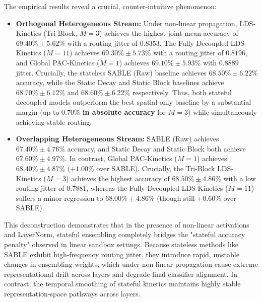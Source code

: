 The empirical results reveal a crucial, counter-intuitive phenomenon:
\begin{itemize}
    \item \textbf{Orthogonal Heterogeneous Stream:} Under non-linear propagation, LDS-Kinetics (Tri-Block, $M=3$) achieves the highest joint mean accuracy of \textbf{$69.40\% \pm 5.62\%$} with a routing jitter of $0.8353$. The Fully Decoupled LDS-Kinetics ($M=11$) achieves $69.30\% \pm 5.73\%$ with a routing jitter of $0.8196$, and Global PAC-Kinetics ($M=1$) achieves $69.10\% \pm 5.93\%$ with $0.8889$ jitter. Crucially, the stateless SABLE (Raw) baseline achieves $68.50\% \pm 6.22\%$ accuracy, while the Static Decay and Static Block baselines achieve $68.70\% \pm 6.12\%$ and $68.60\% \pm 6.22\%$ respectively. Thus, both stateful decoupled models outperform the best spatial-only baseline by a substantial margin (up to \textbf{$0.70\%$ in absolute accuracy} for $M=3$) while simultaneously achieving stable routing.
    \item \textbf{Overlapping Heterogeneous Stream:} SABLE (Raw) achieves $67.40\% \pm 4.76\%$ accuracy, and Static Decay and Static Block both achieve $67.60\% \pm 4.97\%$. In contrast, Global PAC-Kinetics ($M=1$) achieves $68.40\% \pm 4.87\%$ (+$1.00\%$ over SABLE). Crucially, the Tri-Block LDS-Kinetics ($M=3$) achieves the highest accuracy of \textbf{$68.50\% \pm 4.86\%$} with a low routing jitter of $0.7881$, whereas the Fully Decoupled LDS-Kinetics ($M=11$) suffers a minor regression to $68.00\% \pm 4.86\%$ (though still +$0.60\%$ over SABLE).
\end{itemize}
This deconstruction demonstrates that in the presence of non-linear activations and LayerNorm, stateful ensembling completely bridges the "stateful accuracy penalty" observed in linear sandbox settings. Because stateless methods like SABLE exhibit high-frequency routing jitter, they introduce rapid, unstable changes in ensembling weights, which under non-linear propagation cause extreme representational drift across layers and degrade final classifier alignment. In contrast, the temporal smoothing of stateful kinetics maintains highly stable representation-space pathways across layers.


